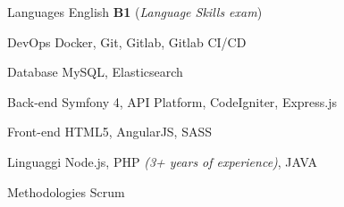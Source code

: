 

\begin{cvskills}

  \cvskill
    {Languages} %
    {English {\bf B1} ({\it Language Skills exam})} %

  \cvskill
    {DevOps} %
    {Docker, Git, Gitlab, Gitlab CI/CD} %

  \cvskill
    {Database} %
    {MySQL, Elasticsearch} %

  \cvskill
    {Back-end} %
    {Symfony 4, API Platform, CodeIgniter, Express.js} %

  \cvskill
    {Front-end} %
    {HTML5, AngularJS, SASS} %

  \cvskill
    {Linguaggi} %
    {Node.js, PHP {\it (3+ years of experience)}, JAVA} %

  \cvskill
    {Methodologies} %
    {Scrum} %

\end{cvskills}

